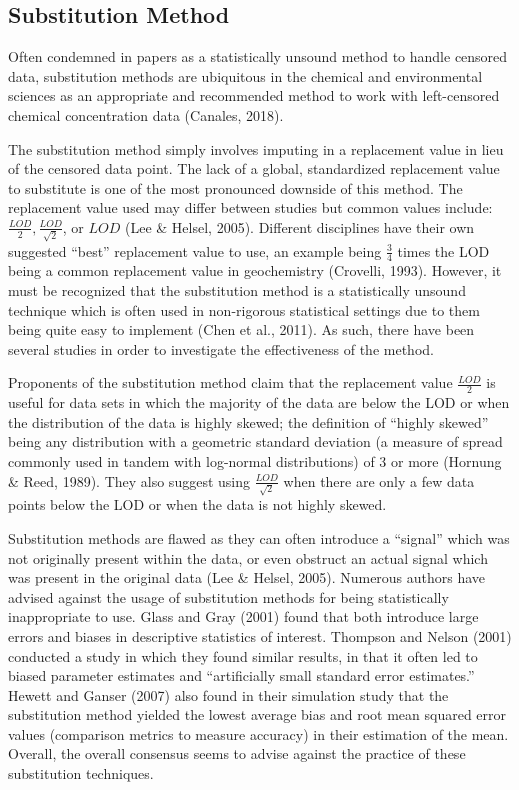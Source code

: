 \documentclass[12pt, twoside]{amherstthesis}
\begin{document}
\hypertarget{Substitution}{%
\subsection{Substitution Method}\label{Substitution}}

Often condemned in papers as a statistically unsound method to handle censored data, substitution methods are ubiquitous in the chemical and environmental sciences as an appropriate and recommended method to work with left-censored chemical concentration data (Canales, 2018).

The substitution method simply involves imputing in a replacement value in lieu of the censored data point. The lack of a global, standardized replacement value to substitute is one of the most pronounced downside of this method. The replacement value used may differ between studies but common values include: \(\frac{LOD}{2}, \frac{LOD}{\sqrt2}\), or \(LOD\) (Lee \& Helsel, 2005). Different disciplines have their own suggested ``best'' replacement value to use, an example being \(\frac{3}{4}\) times the LOD being a common replacement value in geochemistry (Crovelli, 1993). However, it must be recognized that the substitution method is a statistically unsound technique which is often used in non-rigorous statistical settings due to them being quite easy to implement (Chen et al., 2011). As such, there have been several studies in order to investigate the effectiveness of the method.

Proponents of the substitution method claim that the replacement value \(\frac{LOD}{2}\) is useful for data sets in which the majority of the data are below the LOD or when the distribution of the data is highly skewed; the definition of ``highly skewed'' being any distribution with a geometric standard deviation (a measure of spread commonly used in tandem with log-normal distributions) of 3 or more (Hornung \& Reed, 1989). They also suggest using \(\frac{LOD}{\sqrt2}\) when there are only a few data points below the LOD or when the data is not highly skewed.

Substitution methods are flawed as they can often introduce a ``signal'' which was not originally present within the data, or even obstruct an actual signal which was present in the original data (Lee \& Helsel, 2005). Numerous authors have advised against the usage of substitution methods for being statistically inappropriate to use. Glass and Gray (2001) found that both introduce large errors and biases in descriptive statistics of interest. Thompson and Nelson (2001) conducted a study in which they found similar results, in that it often led to biased parameter estimates and ``artificially small standard error estimates.'' Hewett and Ganser (2007) also found in their simulation study that the substitution method yielded the lowest average bias and root mean squared error values (comparison metrics to measure accuracy) in their estimation of the mean. Overall, the overall consensus seems to advise against the practice of these substitution techniques.
\end{document}

